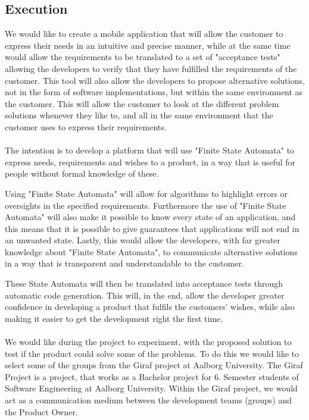 \subsection{Execution}
We would like to create a mobile application that will allow the customer to express their needs in an intuitive and precise manner, while at the same time would allow the requirements to be translated to a set of "acceptance tests" allowing the developers to verify that they have fulfilled the requirements of the customer.
This tool will also allow the developers to propose alternative solutions, not in the form of software implementations, but within the same environment as the customer. 
This will allow the customer to look at the different problem solutions whenever they like to, and all in the same environment that the customer uses to express their requirements. 
\\\\
The intention is to develop a platform that will use "Finite State Automata" to express needs, requirements and wishes to a product, in a way that is useful for people without formal knowledge of these. 

Using "Finite State Automata" will allow for algorithms to highlight errors or oversights in the specified requirements.
Furthermore the use of "Finite State Automata" will also make it possible to know every state of an application, and this means that it is possible to give guarantees that applications will not end in an unwanted state. 
Lastly, this would allow the developers, with far greater knowledge about "Finite State Automata", to communicate alternative solutions in a way that is transparent and understandable to the customer. 

These State Automata will then be translated into acceptance tests through automatic code generation.
This will, in the end, allow the developer greater confidence in developing a product that fulfils the customers' wishes, while also making it easier to get the development right the first time.
\\\\
We would like during the project to experiment, with the proposed solution to test if the product could solve some of the problems.
To do this we would like to select some of the groups from the Giraf project at Aalborg University.
The Giraf Project is a project, that works as a Bachelor project for 6. Semester students of Software Engineering at Aalborg University. 
Within the Giraf project, we would act as a communication medium between the development teams (groups) and the Product Owner.

